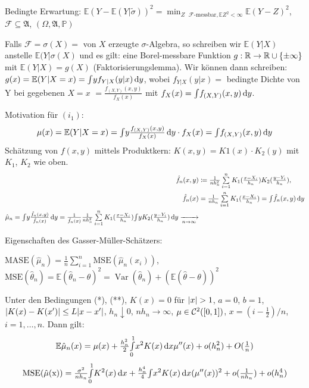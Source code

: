 \documentclass{cheat-sheet}
\newcommand{\Alg}{\mathfrak{A}} %
\renewcommand{\P}{\mathbb{P}} %
\newcommand{\E}{\mathbb{E}} %
\newcommand{\Cont}{\mathcal{C}} %
\DeclareMathOperator{\var}{Var} %
\begin{document}
Bedingte Erwartung: $\E (Y - \E(Y | \tilde{\sigma}))^2 = \min_{Z \text{ $\mathcal{F}$-messbar}, \E Z^2 < \infty} \E (Y-Z)^2$, $\mathcal{F} \subseteq \Alg$, $(\Omega, \Alg, \P)$

Falls $\mathcal{F} = \sigma(X) = $ von $X$ erzeugte $\sigma$-Algebra, so schreiben wir $\E(Y|X)$ anstelle $\E(Y|\sigma(X)$ und es gilt: eine Borel-messbare Funktion $g : \mathbb{R} \to \mathbb{R} \cup \{ \pm \infty \}$ mit $\E(Y|X) = g(X)$ (Faktorisierungslemma).
Wir können dann schreiben: $g(x) = \E(Y|X=x) = \IInt{y f_{Y|X}(y|x)}{y}$, wobei $f_{Y|X}(y|x) =$ bedingte Dichte von Y bei gegebenen $X=x$ $= \frac{f_{(X, Y)}(x, y)}{f_X(x)}$ mit $f_X(x) = {\textstyle \int} f_{(X, Y)}(x,y) \,\mathrm{d} y$.

Motivation für $(i_1)$:
\[
  \mu(x) = \E(Y|X=x) = \IInt{y \tfrac{f_{(X,Y)}(x,y)}{f_X(x)}}{y} \cdot f_X(x) = \IInt{f_{(X,Y)} (x,y)}{y}
\]
Schätzung von $f(x,y)$ mittels Produktkern: $K(x, y) = K1(x) \cdot K_2(y)$ mit $K_1$, $K_2$ wie oben. %
\begin{align*}
  \hat{f}_n(x, y) & \coloneqq \tfrac{1}{n h_n^2} \sum_{i=1}^n K_1(\tfrac{x-X_i}{h_n}) K_2(\tfrac{y-Y_i}{h_n}), \\
  \hat{f}_n(x) & = \tfrac{1}{n h_n} \sum_{i=1}^n K_1(\tfrac{x - X_i}{h_n}) = \IInt{\hat{f}_n(x,y)}{y} \\
  \hat{\mu}_n = \IInt{y \tfrac{\hat{f}_n(x,y)}{\hat{f}_n(x)}}{y} = \tfrac{1}{\hat{f}_n(x)} \tfrac{1}{n h_n^2} \sum_{i=1}^n K_1(\tfrac{x - X_i}{h_n}) \IInt{y K_2(\tfrac{y - Y_i}{h_n})}{y} \xra[n \to \infty]{} 
\end{align*}

Eigenschaften des Gasser-Müller-Schätzers:

$\mathrm{MASE}(\hat{\mu}_n) = \tfrac{1}{n} \sum_{i=1}^n \mathrm{MSE}(\hat{\mu}_n (x_i))$, $\mathrm{MSE}(\hat{\theta}_n) = \E (\hat{\theta}_n - \theta)^2 = \var(\hat{\theta}_n) + (\E (\hat{\theta} - \theta))^2$

\begin{satz}
  Unter den Bedingungen (*), (**), $K(x) = 0$ für $\lvert x\rvert > 1$, $a=0$, $b=1$, $\lvert K(x) - K(x')\rvert \leq L \lvert x - x'\rvert$, $h_n \downarrow 0$, $n h_n \to \infty$, $\mu \in \Cont^2(\cinterval{0}{1})$, $x = (i - \tfrac{1}{2}) / n$, $i = 1, \ldots, n$.
  Dann gilt:
  \[
    \E \hat{\mu}_n(x) = \mu(x) + \tfrac{h_n^2}{2} \Int{0}{1}{x^2 K(x)}{x} \mu''(x) + o(h_n^2) + O(\tfrac{1}{n})
  \]
  \[
    \mathrm{MSE(\hat{\mu}(x))} = \tfrac{\sigma^2}{n h_n} {\textstyle \int\limits_{0}^{1}} K^2 (x) \,\mathrm{d} x + \tfrac{h_n^4}{4} {\textstyle \int} x^2 K(x) \,\mathrm{d} x (\mu''(x))^2 + o(\tfrac{1}{n h_n}) + o(h_n^4)
  \]
\end{satz}
\end{document}
